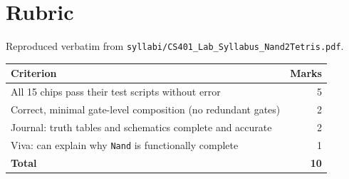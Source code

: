 \documentclass[11pt]{article}
\begin{document}
\section{Rubric}

Reproduced verbatim from \texttt{syllabi/CS401\_Lab\_Syllabus\_Nand2Tetris.pdf}.

\begin{table}[h]
\centering
\begin{tabular}{@{}l r@{}}
\toprule
Criterion & Marks \\
\midrule
All 15 chips pass their test scripts without error & 5 \\
Correct, minimal gate-level composition (no redundant gates) & 2 \\
Journal: truth tables and schematics complete and accurate & 2 \\
Viva: can explain why \texttt{Nand} is functionally complete & 1 \\
\midrule
\textbf{Total} & \textbf{10} \\
\bottomrule
\end{tabular}
\end{table}
\end{document}
